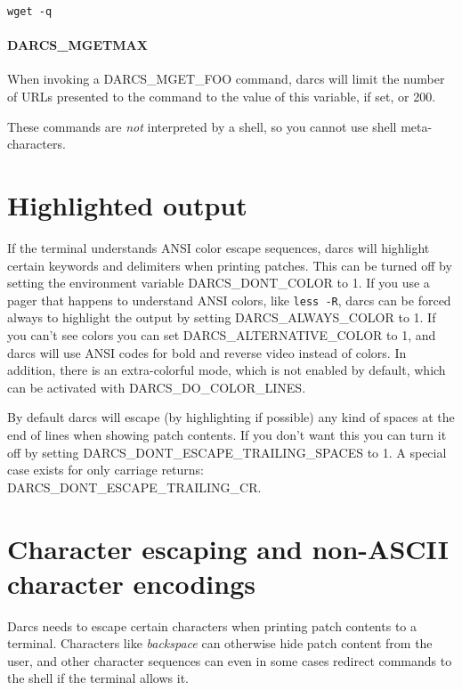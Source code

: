 \begin{verbatim}
wget -q 
\end{verbatim}

\paragraph{DARCS\_MGETMAX}
\label{env:DARCS_MGETMAX}
When invoking a DARCS\_MGET\_FOO command, darcs will limit the
number of URLs presented to the command to the value of this variable,
if set, or 200.

These commands are \emph{not} interpreted by a shell, so you cannot use shell
meta-characters.

\section{Highlighted output}
\label{env:DARCS_ALWAYS_COLOR}
\label{env:DARCS_DO_COLOR_LINES}
\label{env:DARCS_DONT_ESCAPE_white}

If the terminal understands ANSI color escape sequences,
darcs will highlight certain keywords and delimiters when printing patches.
This can be turned off by setting the environment variable DARCS\_DONT\_COLOR to 1.
If you use a pager that happens to understand ANSI colors, like \verb!less -R!,
darcs can be forced always to highlight the output
by setting DARCS\_ALWAYS\_COLOR to 1.
If you can't see colors you can set DARCS\_ALTERNATIVE\_COLOR to 1,
and darcs will use ANSI codes for bold and reverse video instead of colors.
In addition, there is an extra-colorful mode, which is not enabled by
default, which can be activated with DARCS\_DO\_COLOR\_LINES.

By default darcs will escape (by highlighting if possible) any kind of spaces at the end of lines
when showing patch contents.
If you don't want this you can turn it off by setting
DARCS\_DONT\_ESCAPE\_TRAILING\_SPACES to 1.
A special case exists for only carriage returns:
DARCS\_DONT\_ESCAPE\_TRAILING\_CR.


\section{Character escaping and non-ASCII character encodings}
\label{env:DARCS_DONT_ESCAPE_nonascii}

Darcs needs to escape certain characters when printing patch contents to a terminal.
Characters like \emph{backspace} can otherwise hide patch content from the user,
and other character sequences can even in some cases redirect commands to the shell
if the terminal allows it.

